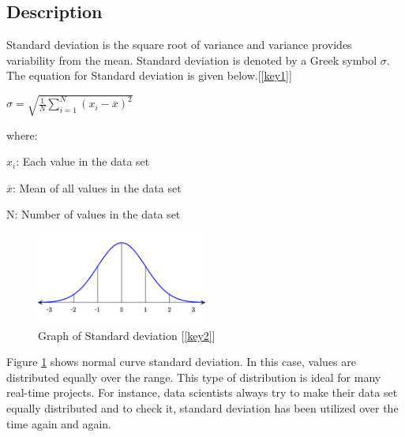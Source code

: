 \documentclass{scrartcl}
\begin{document}
\subsection{Description}
\begin{Large}
Standard deviation is the square root of variance and variance provides variability from the mean. Standard deviation is denoted by a Greek symbol $\sigma$. The equation for Standard deviation is given below.[\ref{key1}] 

\begin{center}
\vspace{0.2cm}
\begin{Large}
$\sigma = \sqrt{\frac{1}{N} \sum_{i=1}^N (x_i - \overline{x})^2}$
\end{Large}
\end{center}

where:

${x_i}$: Each value in the data set

$\overline{x}$: Mean of all values in the data set

N: Number of values in the data set

\begin{figure}
    \centering
    \includegraphics[width=0.5\textwidth]{Graphics/sd.png}
    \caption{Graph of Standard deviation [\ref{key2}]}
    \label{fig:Graph of Standard deviation}
\end{figure}

\vspace{0.2cm}
Figure \ref{fig:Graph of Standard deviation} shows normal curve standard deviation. In this case, values are distributed equally over the range. This type of distribution is ideal for many real-time projects. For instance, data scientists always try to make their data set equally distributed and to check it, standard deviation has been utilized over the time again and again. 

\end{Large}
\end{document}
